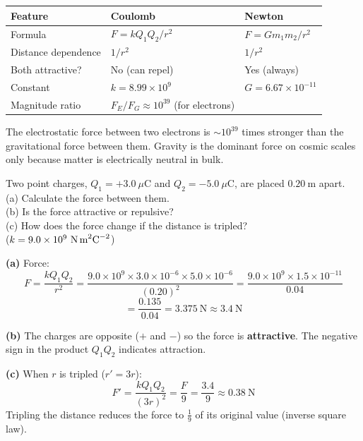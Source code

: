 \begin{keybox}
\begin{center}
\begin{tabular}{lll}
\toprule
\textbf{Feature} & \textbf{Coulomb} & \textbf{Newton}\\
\midrule
Formula & $F = kQ_1Q_2/r^2$ & $F = Gm_1m_2/r^2$\\
Distance dependence & $1/r^2$ & $1/r^2$\\
Both attractive? & No (can repel) & Yes (always)\\
Constant & $k = 8.99\times10^9$ &
  $G = 6.67\times10^{-11}$\\
Magnitude ratio & $F_E/F_G \approx 10^{39}$ (for electrons) & \\
\bottomrule
\end{tabular}
\end{center}
\vspace{0.3cm}
The electrostatic force between two electrons is
$\sim10^{39}$ times stronger than the gravitational
force between them. Gravity is the dominant force
on cosmic scales only because matter is electrically
neutral in bulk.
\end{keybox}

\begin{examplebox}[21.1]
Two point charges, $Q_1 = +3.0\ \mu\text{C}$ and
$Q_2 = -5.0\ \mu\text{C}$, are placed $0.20\ \text{m}$
apart.\\
(a) Calculate the force between them.\\
(b) Is the force attractive or repulsive?\\
(c) How does the force change if the distance is
tripled?\\
($k = 9.0\times10^9\ \text{N\,m}^2\text{C}^{-2}$)
\end{examplebox}

\begin{solutionbox}
\textbf{(a)} Force:
\[
  F = \frac{kQ_1Q_2}{r^2}
  = \frac{9.0\times10^9 \times 3.0\times10^{-6}
    \times 5.0\times10^{-6}}{(0.20)^2}
  = \frac{9.0\times10^9 \times 1.5\times10^{-11}}
    {0.04}
\]
\[
  = \frac{0.135}{0.04} = 3.375\ \text{N}
  \approx 3.4\ \text{N}
\]

\textbf{(b)} The charges are opposite ($+$ and $-$)
so the force is \textbf{attractive}. The negative
sign in the product $Q_1Q_2$ indicates attraction.

\textbf{(c)} When $r$ is tripled ($r' = 3r$):
\[
  F' = \frac{kQ_1Q_2}{(3r)^2}
  = \frac{F}{9} = \frac{3.4}{9} \approx 0.38\ \text{N}
\]
Tripling the distance reduces the force to
$\frac{1}{9}$ of its original value (inverse square
law).
\end{solutionbox}

